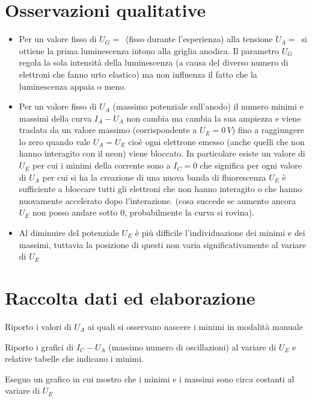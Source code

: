 \documentclass[10pt,a4paper]{article}
\begin{document}
\section{Osservazioni qualitative}
\begin{itemize}
\item Per un valore fisso di $U_G = \, $ (fisso durante l'esperienza) alla tensione $U_A = \, $ si ottiene la prima luminescenza intono alla griglia anodica. Il parametro $U_G$ regola la sola intensità della luminescenza (a causa del diverso numero di elettroni che fanno urto elastico) ma non influenza il fatto che la luminescenza appaia o meno.
\item Per un valore fisso di $U_A$ (massimo potenziale sull'anodo) il numero minimi e massimi della curva $I_A-U_A$ non cambia ma cambia la sua ampiezza e viene traslata da un valore massimo (corrispondente a $U_E = 0 \, V$) fino a raggiungere lo zero quando vale $U_A = U_E$ cioè ogni elettrone emesso (anche quelli che non hanno interagito con il neon) viene bloccato. In particolare esiste un valore di $U_E$ per cui i minimi della corrente sono a $I_C = 0$ che significa per ogni valore di $U_A$ per cui si ha la creazione di una nuova banda di fluorescenza $U_E$ è sufficiente a bloccare tutti gli elettroni che non hanno interagito o che hanno nuovamente accelerato dopo l'interazione. (cosa succede se aumento  ancora $U_E$ non posso andare sotto 0, probabilmente la curva si rovina).
\item Al diminuire del potenziale $U_E$ è più difficile l'individuazione dei minimi e dei massimi, tuttavia la posizione di questi non varia significativamente al 
variare di $U_E$ 
\end{itemize}
 

\section{Raccolta dati ed elaborazione}


Riporto i valori di $U_A$ ai quali si osservano nascere i minimi in modalità manuale

Riporto i grafici di $I_C-U_A$ (massimo numero di oscillazioni) al variare di $U_E$ e relative tabelle che indicano i minimi.

Eseguo un grafico in cui mostro che i minimi e i massimi sono circa costanti al variare di $U_E$
\end{document}
